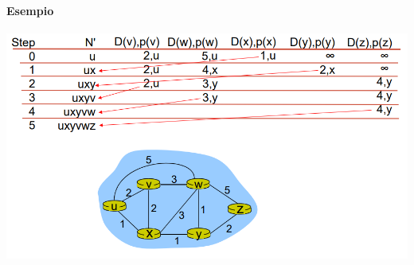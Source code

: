 \documentclass[10pt]{article}
\begin{document}
\paragraph{Esempio}
\begin{center}
	\includegraphics[scale=0.7]{dijkstraexample.png}
\end{center}
\pagebreak
\end{document}
